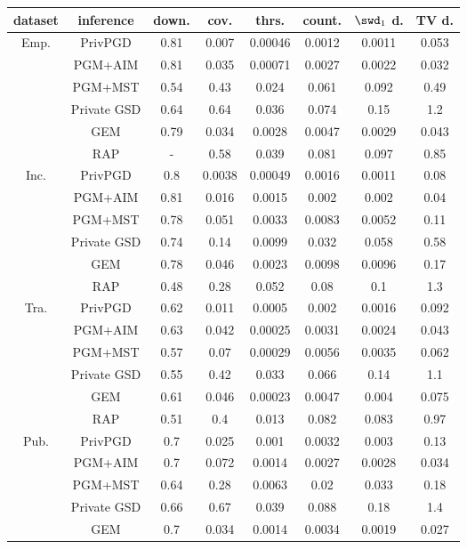 \begin{table*}[ht]
\centering
\begin{tabular}{cccccccc}
\toprule
dataset & inference & down. & cov. & thrs. & count. & $\swd_1$ d. & TV d. \\
\midrule
\multirow{6}{*}{Emp. } & PrivPGD&0.81 & 0.007 & 0.00046 & 0.0012 & 0.0011 & 0.053 \\
 & PGM+AIM&0.81 & 0.035 & 0.00071 & 0.0027 & 0.0022 & 0.032 \\
 & PGM+MST&0.54 & 0.43 & 0.024 & 0.061 & 0.092 & 0.49 \\
 & Private GSD&0.64 & 0.64 & 0.036 & 0.074 & 0.15 & 1.2 \\
 & GEM&0.79 & 0.034 & 0.0028 & 0.0047 & 0.0029 & 0.043 \\
 & RAP&- & 0.58 & 0.039 & 0.081 & 0.097 & 0.85 \\
\multirow{6}{*}{Inc. } & PrivPGD&0.8 & 0.0038 & 0.00049 & 0.0016 & 0.0011 & 0.08 \\
 & PGM+AIM&0.81 & 0.016 & 0.0015 & 0.002 & 0.002 & 0.04 \\
 & PGM+MST&0.78 & 0.051 & 0.0033 & 0.0083 & 0.0052 & 0.11 \\
 & Private GSD&0.74 & 0.14 & 0.0099 & 0.032 & 0.058 & 0.58 \\
 & GEM&0.78 & 0.046 & 0.0023 & 0.0098 & 0.0096 & 0.17 \\
 & RAP&0.48 & 0.28 & 0.052 & 0.08 & 0.1 & 1.3 \\
\multirow{6}{*}{Tra. } & PrivPGD&0.62 & 0.011 & 0.0005 & 0.002 & 0.0016 & 0.092 \\
 & PGM+AIM&0.63 & 0.042 & 0.00025 & 0.0031 & 0.0024 & 0.043 \\
 & PGM+MST&0.57 & 0.07 & 0.00029 & 0.0056 & 0.0035 & 0.062 \\
 & Private GSD&0.55 & 0.42 & 0.033 & 0.066 & 0.14 & 1.1 \\
 & GEM&0.61 & 0.046 & 0.00023 & 0.0047 & 0.004 & 0.075 \\
 & RAP&0.51 & 0.4 & 0.013 & 0.082 & 0.083 & 0.97 \\
\multirow{6}{*}{Pub. } & PrivPGD&0.7 & 0.025 & 0.001 & 0.0032 & 0.003 & 0.13 \\
 & PGM+AIM&0.7 & 0.072 & 0.0014 & 0.0027 & 0.0028 & 0.034 \\
 & PGM+MST&0.64 & 0.28 & 0.0063 & 0.02 & 0.033 & 0.18 \\
 & Private GSD&0.66 & 0.67 & 0.039 & 0.088 & 0.18 & 1.4 \\
 & GEM&0.7 & 0.034 & 0.0014 & 0.0034 & 0.0019 & 0.027 \\

\end{tabular}
\end{table*}
